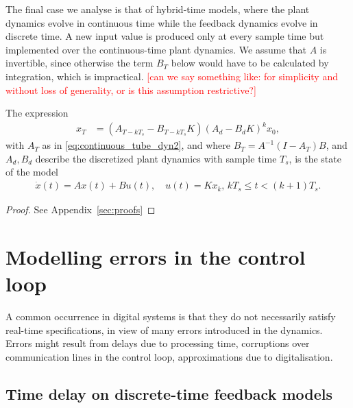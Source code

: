 \documentclass[sigconf]{llncs}
\newcommand{\mat}[1]{{#1}}
\renewcommand{\vec}[1]{{#1}}
\renewcommand{\note}[1]{\textcolor{red}{[#1]}}
\begin{document}
The final case we analyse is that of hybrid-time models, 
where the plant dynamics evolve in continuous time while the feedback dynamics evolve in discrete time.  
A new input value is produced only at every sample time but implemented over the continuous-time plant dynamics. 
We assume that $\mat{A}$ is invertible, since otherwise the term $B_T$ below would have to be calculated by integration, which is impractical. \note{can we say something like: for simplicity and
without loss of generality, or is this assumption restrictive?}

%
\begin{theorem}
The expression
 \begin{align}
 \vec{x}_{T} &= (\mat{A}_{T-kT_s}-\mat{B}_{T-kT_s}\mat{K}) (\mat{A}_d-\mat{B}_d\mat{K})^k\vec{x}_0, 
 \label{eq:cyber_feedback}
 \end{align}
 with $\mat{A}_T$ as in \eqref{eq:continuous_tube_dyn2}, 
 and where $\mat{B}_T=\mat{A}^{-1}(\mat{I}-\mat{A}_T)\mat{B}$, 
 and $\mat{A}_d, \mat{B}_d$ describe the discretized plant dynamics with sample time $T_s$, 
 is the state of the model 
 \begin{align}
 \dot{\vec{x}}(t) = \mat{A}\vec{x}(t)+\mat{B}\vec{u}(t), \quad 
 \vec{u}(t)=\mat{K}\vec{x}_k,  \,
 kT_s \leq t < (k+1)T_s. 
 \end{align}
 \end{theorem}
\begin{proof}
See Appendix~\ref{sec:proofs}
\end{proof}

\section{Modelling errors in the control loop}\label{sec:errors}

A common occurrence in digital systems is that they do not necessarily satisfy real-time specifications, 
in view of many errors introduced in the dynamics. 
Errors might result from delays due to processing time,
corruptions over communication lines in the control loop, 
approximations due to digitalisation.  

\subsection{Time delay on discrete-time feedback models} \label{sec:delay}
\end{document}
